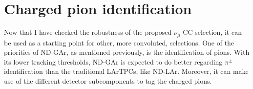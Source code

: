 \section{Charged pion identification}
\label{sec:gar_charged_pions}

Now that I have checked the robustness of the proposed $\nu_{\mu}$ CC selection, it can be used as a starting point for other, more convoluted, selections. One of the priorities of ND-GAr, as mentioned previously, is the identification of pions. With its lower tracking thresholds, ND-GAr is expected to do better regarding $\pi^{\pm}$ identification than the traditional LArTPCs, like ND-LAr. Moreover, it can make use of the different detector subcomponents to tag the charged pions.

